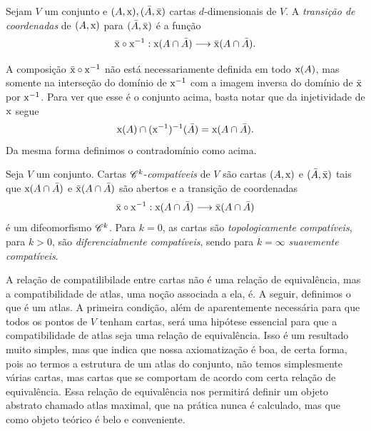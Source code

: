 \begin{defi}
Sejam $V$ um conjunto e $(A,\mathrm{x}),(\bar A,\bar{\mathrm{x}})$ cartas $d$-dimensionais de $V$. A \emph{transição de coordenadas} de $(A,\mathrm{x})$ para $(\bar A,\bar{\mathrm{x}})$ é a função
	\begin{equation*}
	\bar{\mathrm{x}} \circ \mathrm{x}^{-1}: \mathrm{x}(A \cap \bar A) \longrightarrow \bar{\mathrm{x}}(A \cap \bar A).
	\end{equation*}
\end{defi}

A composição $\bar{\mathrm{x}} \circ \mathrm{x}^{-1}$ não está necessariamente definida em todo $\mathrm{x}(A)$, mas somente na interseção do domínio de $\mathrm{x}^{-1}$ com a imagem inversa do domínio de $\bar{\mathrm{x}}$ por $\mathrm{x}^{-1}$. Para ver que esse é o conjunto acima, basta notar que da injetividade de $\mathrm{x}$ segue
	\begin{equation*}
	\mathrm{x}(A) \cap (\mathrm{x}^{-1})^{-1}(\bar A) = \mathrm{x}(A \cap \bar A).
	\end{equation*}
Da mesma forma definimos o contradomínio como acima.

\begin{defi}
Seja $V$ um conjunto. Cartas $\mathscr{C}^k$-\emph{compatíveis} de $V$ são cartas $(A,\mathrm{x})$ e $(\bar A,\bar{\mathrm{x}})$ tais que $\mathrm{x}(A \cap \bar A)$ e $\bar{\mathrm{x}}(A \cap \bar A)$ são abertos e a transição de coordenadas
	\begin{equation*}
	\bar{\mathrm{x}} \circ \mathrm{x}^{-1}: \mathrm{x}(A \cap \bar A) \longrightarrow \bar{\mathrm{x}}(A \cap \bar A)
	\end{equation*}
é um difeomorfismo $\mathscr{C}^k$. Para $k=0$, as cartas são \emph{topologicamente compatíveis}, para $k>0$, são \emph{diferencialmente compatíveis}, sendo para $k=\infty$ \emph{suavemente compatíveis}.
\end{defi}

A relação de compatilibilade entre cartas não é uma relação de equivalência, mas a compatibilidade de atlas, uma noção associada a ela, é. A seguir, definimos o que é um atlas. A primeira condição, além de aparentemente necessária para que todos os pontos de $V$ tenham cartas, será uma hipótese essencial para que a compatibilidade de atlas seja uma relação de equivalência. Isso é um resultado muito simples, mas que indica que nossa axiomatização é boa, de certa forma, pois ao termos a estrutura de um atlas do conjunto, não temos simplesmente várias cartas, mas cartas que se comportam de acordo com certa relação de equivalência. Essa relação de equivalência nos permitirá definir um objeto abstrato chamado atlas maximal, que na prática nunca é calculado, mas que como objeto teórico é belo e conveniente.

